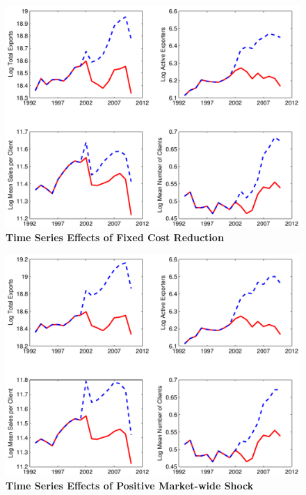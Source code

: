 \documentclass[12pt,titlepage]{article}
\begin{document}
\begin{figure}[tbp]
\centering
\includegraphics[width=\textwidth]{figures/figure4-eps-converted-to.pdf}
\caption{\textbf{Time Series Effects of Fixed Cost Reduction}}
\label{fig:cost_dec_subplot}
\end{figure}
\newpage

\begin{figure}[tbp]
\centering
\includegraphics[width=\textwidth]{figures/figure5-eps-converted-to.pdf}
\caption{\textbf{Time Series Effects of Positive Market-wide Shock}}
\label{fig:mac_bump_subplot}
\end{figure}
\end{document}
